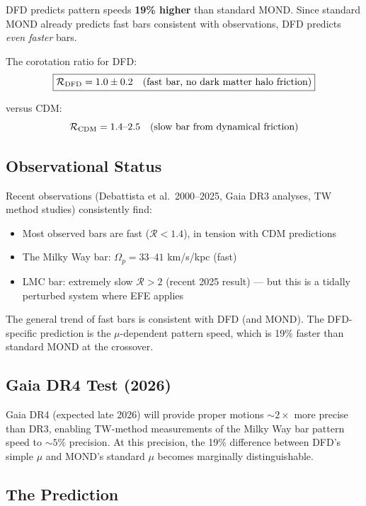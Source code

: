 \documentclass[11pt]{article}
\begin{document}
DFD predicts pattern speeds \textbf{19\% higher} than standard MOND. Since standard
MOND already predicts fast bars consistent with observations, DFD predicts
\emph{even faster} bars.

The corotation ratio for DFD:
\begin{equation}
\boxed{\mathcal{R}_{\rm DFD} = 1.0 \pm 0.2 \quad\text{(fast bar, no dark matter halo friction)}}
\end{equation}

versus CDM:
\begin{equation}
\mathcal{R}_{\rm CDM} = 1.4\text{--}2.5 \quad\text{(slow bar from dynamical friction)}
\end{equation}

\subsection{Observational Status}

Recent observations (Debattista et al.\ 2000--2025, Gaia DR3 analyses, TW method
studies) consistently find:
\begin{itemize}
\item Most observed bars are fast ($\mathcal{R} < 1.4$), in tension with CDM predictions
\item The Milky Way bar: $\Omega_p = 33$--$41$ km/s/kpc (fast)
\item LMC bar: extremely slow $\mathcal{R} > 2$ (recent 2025 result) --- but this is
a tidally perturbed system where EFE applies
\end{itemize}

The general trend of fast bars is consistent with DFD (and MOND). The DFD-specific
prediction is the $\mu$-dependent pattern speed, which is 19\% faster than standard
MOND at the crossover.

\subsection{Gaia DR4 Test (2026)}

Gaia DR4 (expected late 2026) will provide proper motions $\sim 2\times$ more precise
than DR3, enabling TW-method measurements of the Milky Way bar pattern speed to
$\sim 5\%$ precision. At this precision, the 19\% difference between DFD's simple
$\mu$ and MOND's standard $\mu$ becomes marginally distinguishable.

\subsection{The Prediction}
\end{document}
